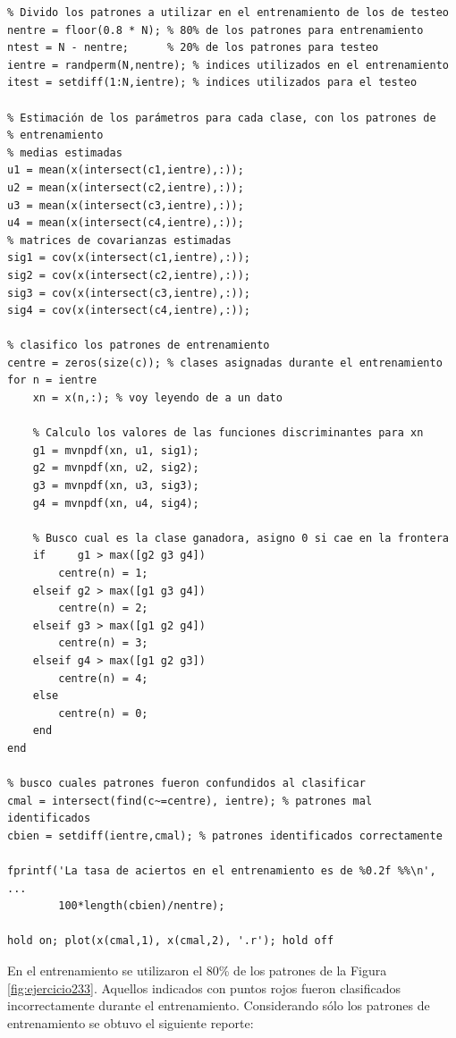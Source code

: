 \documentclass[11pt,a4paper,final]{article}
\begin{document}
\begin{verbatim}
% Divido los patrones a utilizar en el entrenamiento de los de testeo
nentre = floor(0.8 * N); % 80% de los patrones para entrenamiento
ntest = N - nentre;      % 20% de los patrones para testeo
ientre = randperm(N,nentre); % indices utilizados en el entrenamiento
itest = setdiff(1:N,ientre); % indices utilizados para el testeo

% Estimación de los parámetros para cada clase, con los patrones de
% entrenamiento
% medias estimadas
u1 = mean(x(intersect(c1,ientre),:));
u2 = mean(x(intersect(c2,ientre),:));
u3 = mean(x(intersect(c3,ientre),:));
u4 = mean(x(intersect(c4,ientre),:));
% matrices de covarianzas estimadas
sig1 = cov(x(intersect(c1,ientre),:));
sig2 = cov(x(intersect(c2,ientre),:));
sig3 = cov(x(intersect(c3,ientre),:));
sig4 = cov(x(intersect(c4,ientre),:));

% clasifico los patrones de entrenamiento
centre = zeros(size(c)); % clases asignadas durante el entrenamiento
for n = ientre
    xn = x(n,:); % voy leyendo de a un dato

    % Calculo los valores de las funciones discriminantes para xn
    g1 = mvnpdf(xn, u1, sig1);
    g2 = mvnpdf(xn, u2, sig2);
    g3 = mvnpdf(xn, u3, sig3);
    g4 = mvnpdf(xn, u4, sig4);

    % Busco cual es la clase ganadora, asigno 0 si cae en la frontera
    if     g1 > max([g2 g3 g4])
        centre(n) = 1;
    elseif g2 > max([g1 g3 g4])
        centre(n) = 2;
    elseif g3 > max([g1 g2 g4])
        centre(n) = 3;
    elseif g4 > max([g1 g2 g3])
        centre(n) = 4;
    else
        centre(n) = 0;
    end
end

% busco cuales patrones fueron confundidos al clasificar
cmal = intersect(find(c~=centre), ientre); % patrones mal identificados
cbien = setdiff(ientre,cmal); % patrones identificados correctamente

fprintf('La tasa de aciertos en el entrenamiento es de %0.2f %%\n', ...
        100*length(cbien)/nentre);

hold on; plot(x(cmal,1), x(cmal,2), '.r'); hold off
\end{verbatim}


En el entrenamiento se utilizaron el 80\% de los patrones de la Figura \ref{fig:ejercicio233}. Aquellos indicados con puntos rojos fueron clasificados incorrectamente durante el entrenamiento. Considerando sólo los patrones de entrenamiento se obtuvo el siguiente reporte:
\end{document}
